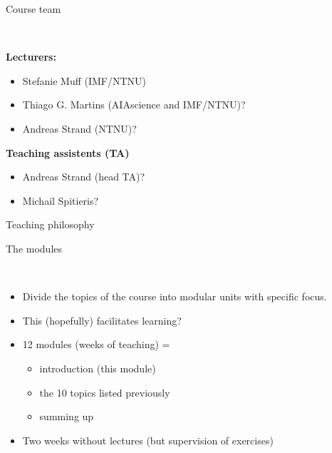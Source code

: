 \documentclass[10pt,ignorenonframetext,]{beamer}
\providecommand{\tightlist}{%
  \setlength{\itemsep}{0pt}\setlength{\parskip}{0pt}}
\begin{document}
\begin{frame}

\begin{block}{Course team}

~

\textbf{Lecturers:}

\begin{itemize}
\tightlist
\item
  Stefanie Muff (IMF/NTNU)
\item
  Thiago G. Martins (AIAscience and IMF/NTNU)?
\item
  Andreas Strand (NTNU)?
\end{itemize}

\textbf{Teaching assistents (TA)}

\begin{itemize}
\tightlist
\item
  Andreas Strand (head TA)?
\item
  Michail Spitieris?
\end{itemize}

\end{block}

\end{frame}

\begin{frame}{Teaching philosophy}

\begin{block}{The modules}

~

\begin{itemize}
\item
  Divide the topics of the course into modular units with specific
  focus.
\item
  This (hopefully) facilitates learning?
\item
  12 modules (weeks of teaching) =

  \begin{itemize}
  \tightlist
  \item
    introduction (this module)
  \item
    the 10 topics listed previously
  \item
    summing up\\
    \hspace*{0.333em}
  \end{itemize}
\item
  Two weeks without lectures (but supervision of exercises)
\end{itemize}

\end{block}

\end{frame}
\end{document}
